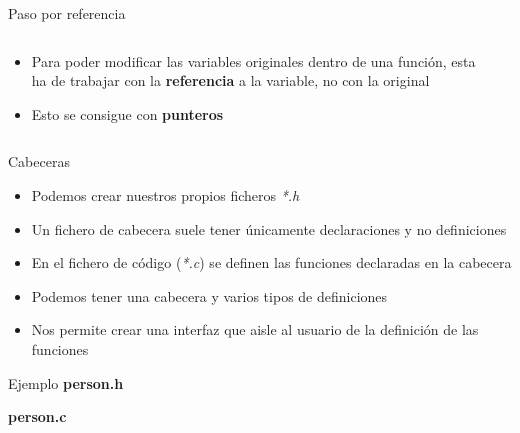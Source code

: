 \documentclass{mybeamer}
\begin{document}
\begin{framesubsubsec}{Paso por referencia}
	\begin{columns}[onlytextwidth]
	\begin{column}{0.5\textwidth}
		\begin{itemize}
			\item Para poder modificar las variables originales
				dentro de una función, esta ha de trabajar con
				la
				\textbf{referencia} a la variable, no con la
				original
			\item Esto se consigue con \textbf{punteros}
		\end{itemize}
	\end{column}

	\begin{column}{0.4\textwidth}
		
	\end{column}
	\end{columns}
\end{framesubsubsec}

\begin{framesec}{Cabeceras}
	\begin{itemize}
		\item Podemos crear nuestros propios ficheros \textit{*.h}
		\item Un fichero de cabecera suele tener únicamente
			declaraciones y no definiciones
		\item En el fichero de código (\textit{*.c}) se definen las
			funciones declaradas en la cabecera
		\item Podemos tener una cabecera y varios tipos de definiciones
		\item Nos permite crear una interfaz que aisle al usuario de la
			definición de las funciones
	\end{itemize}
\end{framesec}

\begin{framesubsec}{Ejemplo}
		\textbf{person.h}
		

		\textbf{person.c}
		

\end{framesubsec}


\def\tFiveCompSol{
	\textbf{Solución:}
	\begin{itemize}
		\item Cada fichero de código puede compilarse de manera
			independiente, creando un \textbf{fichero
			objeto} (\textit{*.o})
		\item El \textbf{linker} se encarga de enlazar todos los
			ficheros objetos para crear el ejecutable
		\item Un módulo objeto puede tener referencias a
			símbolos definidos en otro módulo
	\end{itemize}
	\vspace{1em}
	Cómo se genera: \lstinline[language=sh]|gcc -c persona.c|
}
\end{document}
